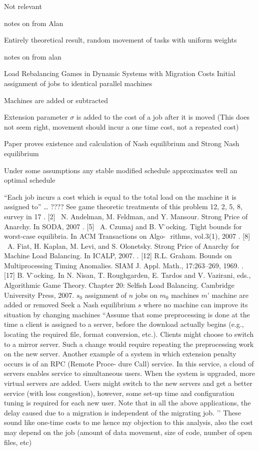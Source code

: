 \documentclass{article}
\begin{document}
Not relevant


\medskip


notes on
\cite{7967109}
from Alan

Entirely theoretical result, random movement of tasks with uniform weights




\medskip

notes on
\cite{BELIKOVETSKY201616}
from alan

Load Rebalancing Games in Dynamic Systems with Migration Costs 
Initial assignment of jobs to identical parallel machines

Machines are added or subtracted

Extension parameter $\sigma$ is added to the cost of a job after it is moved (This does not seem right, movement should incur a one time cost, not a repeated cost)

Paper proves existence and calculation of Nash equilibrium and Strong Nash equilibrium

Under some assumptions any stable modified schedule approximates well an optimal schedule

“Each job incurs a cost which is equal to the total load on the machine it is assigned to” … ????
See game theoretic treatments of this problem 12, 2, 5, 8, survey in 17
	.	[2]  N. Andelman, M. Feldman, and Y. Mansour. Strong Price of Anarchy. In SODA, 2007 
	.	[5]  A. Czumaj and B. V ̈ocking. Tight bounds for worst-case equilibria. In ACM Transactions on Algo-  rithms, vol.3(1), 2007 
	.	[8]  A. Fiat, H. Kaplan, M. Levi, and S. Olonetsky. Strong Price of Anarchy for Machine Load Balancing. In ICALP, 2007. 
	.	[12] R.L. Graham. Bounds on Multiprocessing Timing Anomalies. SIAM J. Appl. Math., 17:263–269, 1969. 
	.	[17] B. V ̈ocking. In N. Nisan, T. Roughgarden, E. Tardos and V. Vazirani, eds., Algorithmic Game Theory. Chapter 20: Selfish Load Balancing. Cambridge University Press, 2007. 
$s_0$ assignment of $n$ jobs on $m_0$ machines
$m’$ machine are added or removed
Seek a Nash equilibrium $s$ where no machine can improve its situation by changing machines
``Assume that some preprocessing is done at the time a client is assigned to a server, before the download actually begins (e.g., locating the required file, format conversion, etc.). Clients might choose to switch to a mirror server. Such a change would require repeating the preprocessing work on the new server.   Another example of a system in which extension penalty occurs is of an RPC (Remote Proce- dure Call) service. In this service, a cloud of servers enables service to simultaneous users. When the system is upgraded, more virtual servers are added. Users might switch to the new servers and get a better service (with less congestion), however, some set-up time and configuration tuning is required for each new user.  Note that in all the above applications, the delay caused due to a migration is independent of the migrating job. 
’’
These sound like one-time costs to me hence my objection to this analysis, also the cost may depend on the job (amount of data movement, size of code, number of open files, etc)
\end{document}
